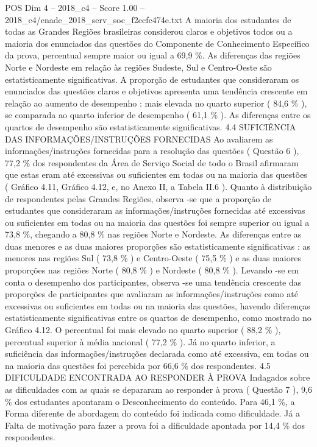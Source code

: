 \begin{textsample}{POS Dim 4 – 2018\_c4 – Score 1.00 – 2018\_c4/enade\_2018\_serv\_soc\_f2ecfc474e.txt}
A maioria dos estudantes de todas as Grandes Regiões brasileiras considerou claros e objetivos todos ou a maioria dos enunciados das questões do Componente de Conhecimento Específico da prova, percentual sempre maior ou igual a 69,9 \%.
As diferenças das regiões Norte e Nordeste em relação às regiões Sudeste, Sul e Centro-Oeste são estatisticamente significativas.
A proporção de estudantes que consideraram os enunciados das questões claros e objetivos apresenta uma tendência crescente em relação ao aumento de desempenho : mais elevada no quarto superior ( 84,6 \% ), se comparada ao quarto inferior de desempenho ( 61,1 \% ).
As diferenças entre os quartos de desempenho são estatisticamente significativas. 4.4 SUFICIÊNCIA DAS INFORMAÇÕES/INSTRUÇÕES FORNECIDAS Ao avaliarem as informações/instruções fornecidas para a resolução das questões ( Questão 6 ), 77,2 \% dos respondentes da Área de Serviço Social de todo o Brasil afirmaram que estas eram até excessivas ou suficientes em todas ou na maioria das questões ( Gráfico 4.11, Gráfico 4.12, e, no Anexo II, a Tabela II.6 ).
Quanto à distribuição de respondentes pelas Grandes Regiões, observa -se que a proporção de estudantes que consideraram as informações/instruções fornecidas até excessivas ou suficientes em todas ou na maioria das questões foi sempre superior ou igual a 73,8 \%, chegando a 80,8 \% nas regiões Norte e Nordeste.
As diferenças entre as duas menores e as duas maiores proporções são estatisticamente significativas : as menores nas regiões Sul ( 73,8 \% ) e Centro-Oeste ( 75,5 \% ) e as duas maiores proporções nas regiões Norte ( 80,8 \% ) e Nordeste ( 80,8 \% ).
Levando -se em conta o desempenho dos participantes, observa -se uma tendência crescente das proporções de participantes que avaliaram as informações/instruções como até excessivas ou suficientes em todas ou na maioria das questões, havendo diferenças estatisticamente significativas entre os quartos de desempenho, como mostrado no Gráfico 4.12.
O percentual foi mais elevado no quarto superior ( 88,2 \% ), percentual superior à média nacional ( 77,2 \% ).
Já no quarto inferior, a suficiência das informações/instruções declarada como até excessiva, em todas ou na maioria das questões foi percebida por 66,6 \% dos respondentes. 4.5 DIFICULDADE ENCONTRADA AO RESPONDER À PROVA Indagados sobre as dificuldades com as quais se depararam ao responder à prova ( Questão 7 ), 9,6 \% dos estudantes apontaram o Desconhecimento do conteúdo.
Para 46,1 \%, a Forma diferente de abordagem do conteúdo foi indicada como dificuldade.
Já a Falta de motivação para fazer a prova foi a dificuldade apontada por 14,4 \% dos respondentes.

\end{textsample}

